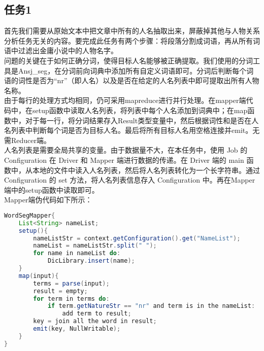 \subsection{任务1}
首先我们需要从原始文本中把文章中所有的人名抽取出来，屏蔽掉其他与人物关系分析任务无关的内容。要完成此任务有两个步骤：将段落分割成词语，再从所有词语中过滤出金庸小说中的人物名字。\\
\indent 问题的关键在于如何正确分词，使得目标人名能够被正确提取。我们使用的分词工具是Ansj\_seg，在分词前向词典中添加所有自定义词语即可。分词后判断每个词语的词性是否为“nr”（即人名）以及是否在给定的人名列表中即可提取出所有人物名称。\\
\indent 由于每行的处理方式均相同，仍可采用mapreduce进行并行处理。在mapper端代码中，在setup函数中读取人名列表，将列表中每个人名添加到词典中；在map函数中，对于每一行，将分词结果存入Result类型变量中，然后根据词性和是否在人名列表中判断每个词是否为目标人名。最后将所有目标人名用空格连接并emit。无需Reducer端。\\
\indent 人名列表是需要全局共享的变量。由于数据量不大，在本任务中，使用 Job 的 Configuration 在 Driver 和 Mapper 端进行数据的传递。在 Driver 端的 main 函数中，从本地的文件中读入人名列表，然后将人名列表转化为一个长字符串。通过 Configuration 的 set 方法，将人名列表信息存入 Configuration 中。再在Mapper端中的setup函数中读取即可。\\
Mapper端伪代码如下所示：
\begin{lstlisting}[language=Java]
WordSegMapper{
	List<String> nameList;
	setup(){
		nameListStr = context.getConfiguration().get("NameList");
		nameList = nameListStr.split(" ");
		for name in nameList do:
			DicLibrary.insert(name);
	}
	map(input){
		terms = parse(input);
		result = empty;
		for term in terms do:
			if term.getNatureStr == "nr" and term is in the nameList:
				add term to result;
		key = join all the word in result;
		emit(key, NullWritable);
	}
}
\end{lstlisting}